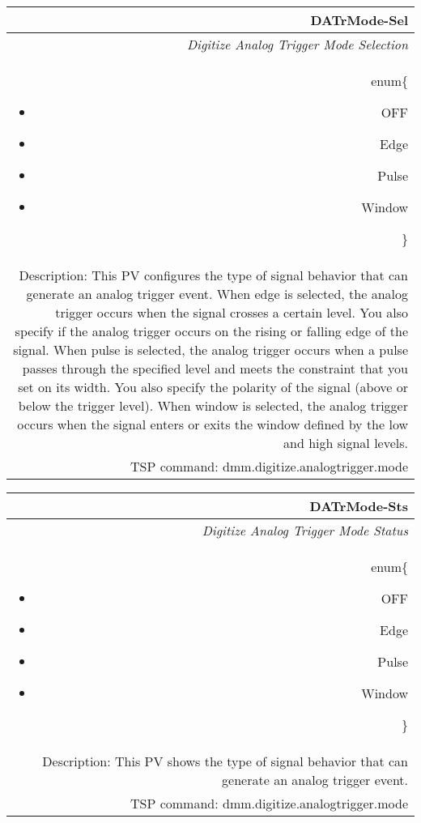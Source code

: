 \documentclass[openany]{article}
\begin{document}
		\begin{tabular}{N}
			\hline
			\bfseries DATrMode-Sel\label{pv:datrmode-sel} \\ \hline
			\emph{Digitize Analog Trigger Mode Selection} \\
			enum\{\begin{itemize}[noitemsep]
				\small
				\item[] OFF
				\item[] Edge
				\item[] Pulse
				\item[] Window
			\end{itemize}\} \\
			Description: This PV configures the type of signal behavior that can generate an analog trigger event. When edge is selected, the analog trigger occurs when the signal crosses a certain level. You also specify if the analog trigger occurs on the rising or falling edge of the signal. When pulse is selected, the analog trigger occurs when a pulse passes through the specified level and meets the constraint that you set on its width. You also specify the polarity of the signal (above or below the trigger level). When window is selected, the analog trigger occurs when the signal enters or exits the window defined by the low and high signal levels.\\
			TSP command: dmm.digitize.analogtrigger.mode
		\end{tabular}

		\begin{tabular}{N}
			\hline
			\bfseries DATrMode-Sts\label{pv:datrmode-sts} \\ \hline
			\emph{Digitize Analog Trigger Mode Status} \\
			enum\{\begin{itemize}[noitemsep]
				\small
				\item[] OFF
				\item[] Edge
				\item[] Pulse
				\item[] Window
			\end{itemize}\} \\
			Description: This PV shows the type of signal behavior that can generate an analog trigger event. \\
			TSP command: dmm.digitize.analogtrigger.mode
		\end{tabular}
\end{document}
